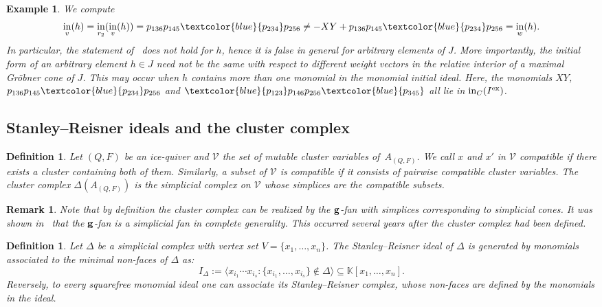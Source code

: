 \documentclass[pdftex]{sigma}%
\newtheorem{Definition}[Theorem]{Definition}
\newtheorem{Example}[Theorem]{Example}
\newtheorem{Remark}[Theorem]{Remark}}
\numberwithin{equation}{section}
\DeclareMathOperator{\init}{in}
\begin{document}
\begin{Example}
We compute
\begin{displaymath}
\init_{v}(h) = \init_{r_2}(\init_{v}(h)) = p_{136}p_{145}\textcolor{blue}{p_{234}}p_{256} \not = -{XY} + p_{136}p_{145}\textcolor{blue}{p_{234}}p_{256} = \init_w(h).
\end{displaymath}
In particular, the statement of~ does not hold for $h$, hence it is false in general for arbitrary elements of $J$.
More importantly, the initial form of an arbitrary element $h\in J$ need not be the same with respect to different weight vectors in the relative interior of a maximal Gr\"obner cone of $J$.
This may occur when $h$ contains more than one monomial in the monomial initial ideal.
Here, the monomials $XY$, $p_{136}p_{145}\textcolor{blue}{p_{234}}p_{256}$ and $\textcolor{blue}{p_{123}}p_{146}p_{256}\textcolor{blue}{p_{345}}$ all lie in $\init_C(I^{\rm ex})$.
\end{Example}

\subsection{Stanley--Reisner ideals and the cluster complex}%

\begin{Definition}
Let $(Q,F)$ be an ice-quiver and $\mathcal{V}$ the set of mutable cluster variables of~$A_{(Q,F)}$.
We call $x$ and $x'$ in $\mathcal{V}$ {\it compatible} if there exists a cluster containing both of them. Similarly, a subset of $\mathcal{V}$ is compatible if it consists of pairwise compatible cluster variables. The {\it cluster complex} $\Delta(A_{(Q,F)})$ is the simplicial complex on $\mathcal{V}$ whose simplices are the compatible subsets.
\end{Definition}

\begin{Remark}
Note that by definition the cluster complex can be realized by the ${\bf g}$-fan with simplices corresponding to simplicial cones.
It was shown in~\cite{GHKK} that the ${\bf g}$-fan is a simplicial fan in complete generality.
This occurred several years after the cluster complex had been defined.
\end{Remark}



\begin{Definition}
Let $\Delta$ be a simplicial complex with vertex set $V=\{x_1,\dots,x_n\}$.
The {\it Stanley--Reisner ideal} of $\Delta$ is generated by monomials associated to the minimal non-faces of $\Delta$ as:
\begin{displaymath}
I_{\Delta}:=\langle x_{i_1} \cdots x_{i_s}\colon \{x_{i_1},\dots,x_{i_s}\}\not\in \Delta\rangle \subseteq \mathbb K[x_1,\dots,x_n].
\end{displaymath}
Reversely, to every squarefree monomial ideal one can associate its {\it Stanley--Reisner complex}, whose non-faces are defined by the monomials in the ideal.
\end{Definition}
\end{document}
